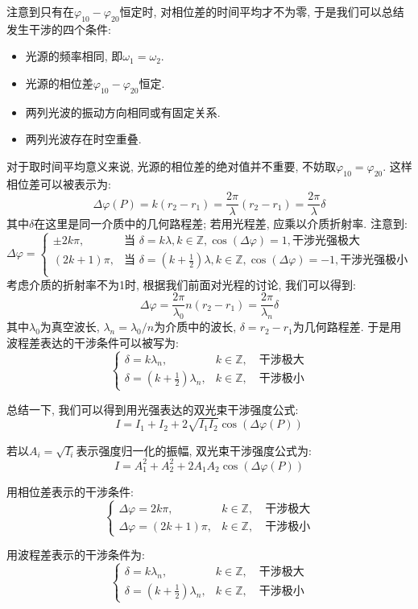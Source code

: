 注意到只有在$\varphi_{10}-\varphi_{20}$恒定时, 对相位差的时间平均才不为零, 于是我们可以总结发生干涉的四个条件:
\begin{itemize}
    \item 光源的频率相同, 即$\omega_1 = \omega_2$.
    \item 光源的相位差$\varphi_{10} - \varphi_{20}$恒定.
    \item 两列光波的振动方向相同或有固定关系.
    \item 两列光波存在时空重叠.
\end{itemize}

对于取时间平均意义来说, 光源的相位差的绝对值并不重要, 不妨取$\varphi_{10}=\varphi_{20}$. 这样相位差可以被表示为:
\[
\Delta \varphi(P) = k(r_2-r_1) = \frac{2\pi}{\lambda}(r_2-r_1) = \frac{2\pi}{\lambda}\delta
\]
其中$\delta$在这里是同一介质中的几何路程差; 若用光程差, 应乘以介质折射率. 注意到:
\[
\Delta \varphi=
\begin{cases}
\pm 2k\pi, & \text{当 } \delta = k\lambda, k \in \mathbb{Z}, \cos(\Delta \varphi)= 1, \text{干涉光强极大} \\
(2k+1)\pi, & \text{当 } \delta = (k+\frac{1}{2})\lambda, k \in \mathbb{Z}, \cos(\Delta \varphi)= -1, \text{干涉光强极小} \\
\end{cases}
\]
考虑介质的折射率不为1时, 根据我们前面对光程的讨论, 我们可以得到:
\[
\Delta \varphi = \frac{2\pi}{\lambda_0} n (r_2-r_1)=\frac{2\pi}{\lambda_n}\delta
\]
其中$\lambda_0$为真空波长, $\lambda_n=\lambda_0/n$为介质中的波长, $\delta=r_2-r_1$为几何路程差. 于是用波程差表达的干涉条件可以被写为:
\[
\begin{cases}
\delta = k \lambda_n, & k \in \mathbb{Z}, \quad \text{干涉极大} \\
\delta = (k+\frac{1}{2})\lambda_n, & k \in \mathbb{Z}, \quad \text{干涉极小}
\end{cases}
\]


总结一下, 我们可以得到用光强表达的双光束干涉强度公式:
\[
I = I_1 + I_2 + 2\sqrt{I_1 I_2} \cos(\Delta \varphi(P))
\]

若以$A_i=\sqrt{I_i}$表示强度归一化的振幅, 双光束干涉强度公式为:
\[
I = A_1^2 + A_2^2 + 2A_1 A_2 \cos(\Delta \varphi(P))
\]

用相位差表示的干涉条件:
\[
\begin{cases}
\Delta \varphi = 2k\pi, & k \in \mathbb{Z}, \quad \text{干涉极大} \\
\Delta \varphi = (2k+1)\pi, & k \in \mathbb{Z}, \quad \text{干涉极小}
\end{cases}
\]

用波程差表示的干涉条件为:
\[
\begin{cases}
\delta = k \lambda_n, & k \in \mathbb{Z}, \quad \text{干涉极大} \\
\delta = (k+\frac{1}{2})\lambda_n, & k \in \mathbb{Z}, \quad \text{干涉极小}
\end{cases}
\]

